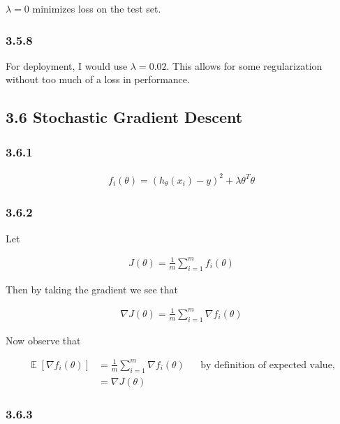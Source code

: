 \documentclass[11pt]{article}
\begin{document}
    \(\lambda=0\) minimizes loss on the test set.

    \subsubsection{3.5.8}\label{section}

    For deployment, I would use \(\lambda=0.02\). This allows for some
regularization without too much of a loss in performance.

    \subsection{3.6 Stochastic Gradient
Descent}\label{stochastic-gradient-descent}

    \subsubsection{3.6.1}\label{section}

    \begin{align}
f_i(\theta) = (h_{\theta}(x_i) - y)^2 + \lambda \theta^T\theta
\end{align}

    \subsubsection{3.6.2}\label{section}

    Let

\begin{align}
J(\theta) = \frac{1}{m}\sum_{i=1}^m f_i(\theta)
\end{align}

Then by taking the gradient we see that

\begin{align}
\nabla J(\theta) = \frac{1}{m}\sum_{i=1}^m \nabla f_i(\theta)
\end{align}

Now observe that

\begin{align}
\mathop{\mathbb{E}}[\nabla f_i(\theta)] &= \frac{1}{m}\sum_{i=1}^m \nabla f_i(\theta) && \text{by definition of expected value,}\\
&= \nabla J(\theta)
\end{align}

    \subsubsection{3.6.3}\label{section}
\end{document}
